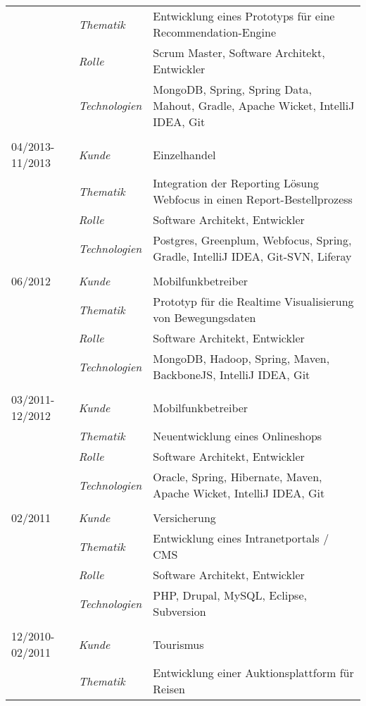 \begin{longtable}{@{}>{}p{4cm}>{\itshape}p{2cm}>{}p{9cm}}
\nopagebreak		& Thematik	    & Entwicklung eines Prototyps für eine Recommendation-Engine\\
\nopagebreak		& Rolle 	    & Scrum Master, Software Architekt, Entwickler\\
\nopagebreak		& Technologien	& MongoDB, Spring, Spring Data, Mahout, Gradle, Apache Wicket, IntelliJ IDEA, Git\\
\\
04/2013-11/2013     & Kunde 	    & Einzelhandel\\
\nopagebreak		& Thematik	    & Integration der Reporting Lösung Webfocus in einen Report-Bestellprozess\\
\nopagebreak		& Rolle 	    & Software Architekt, Entwickler\\
\nopagebreak		& Technologien	& Postgres, Greenplum, Webfocus, Spring, Gradle, IntelliJ IDEA, Git-SVN, Liferay\\
\\
06/2012             & Kunde 	    & Mobilfunkbetreiber\\
\nopagebreak		& Thematik	    & Prototyp für die Realtime Visualisierung von Bewegungsdaten \\
\nopagebreak		& Rolle 	    & Software Architekt, Entwickler\\
\nopagebreak		& Technologien	& MongoDB, Hadoop, Spring, Maven, BackboneJS, IntelliJ IDEA, Git\\
\\
03/2011-12/2012     & Kunde 	    & Mobilfunkbetreiber\\
\nopagebreak		& Thematik	    & Neuentwicklung eines Onlineshops \\
\nopagebreak		& Rolle 	    & Software Architekt, Entwickler\\
\nopagebreak		& Technologien	& Oracle, Spring, Hibernate, Maven, Apache Wicket, IntelliJ IDEA, Git\\
\\
02/2011             & Kunde 	    & Versicherung\\
\nopagebreak		& Thematik	    & Entwicklung eines Intranetportals / CMS\\
\nopagebreak		& Rolle 	    & Software Architekt, Entwickler\\
\nopagebreak		& Technologien	& PHP, Drupal, MySQL, Eclipse, Subversion\\
\\
12/2010-02/2011     & Kunde 	    & Tourismus\\
\nopagebreak		& Thematik	    & Entwicklung einer Auktionsplattform für Reisen\\

\end{longtable}
